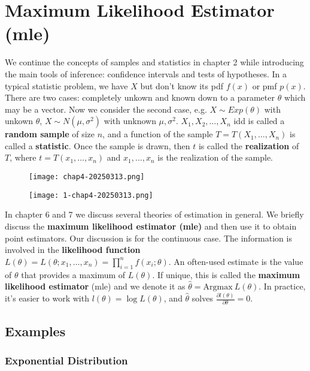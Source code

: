 \section{Maximum Likelihood Estimator (mle)}

We continue the concepts of samples and statistics in chapter 2 while introducing the main tools of inference: confidence intervals and tests of hypotheses.
In a typical statistic problem, we have $X$ but don't know its pdf $f(x)$ or pmf $p(x)$. There are two cases: completely unkown and known down to a parameter $\theta$ which may be a vector. Now we consider the second case, e.g. $X\sim Exp(\theta)$ with unkown $\theta$, $X\sim N(\mu,\sigma^{2})$ with unknown $\mu,\sigma^{2}$.
$X_1,X_2,\dots,X_n$ idd is called a \textbf{random sample} of size $n$, and a function of the sample  $T=T(X_1,\dots,X_n)$  is called a \textbf{statistic}. Once the sample is drawn, then $t$ is called the \textbf{realization} of $T$, where $t=T(x_1,\dots,x_n)$ and $x_1,\dots,x_n$ is the realization of the sample.

\begin{figure}[H]
\centering
\texttt{[image: chap4-20250313.png]}
\label{}
\end{figure}

\begin{figure}[H]
\centering
\texttt{[image: 1-chap4-20250313.png]}
\label{}
\end{figure}

In chapter 6 and 7 we discuss several theories of estimation in general. We briefly discuss the \textbf{maximum likelihood estimator (mle)} and then use it to obtain point estimators. Our discussion is for the continuous case.
The information is involved in the \textbf{likelihood function} $L(\theta)=L(\theta;x_1,\dots,x_n)=\prod_{i=1}^{n}f(x_i;\theta)$. An often-used estimate is the value of $\theta$ that provides a maximum of $L(\theta)$. If unique, this is called the \textbf{maximum likelihood estimator} (mle) and we denote it as $\widehat{\theta}=\mathrm{Argmax}\ L(\theta)$. In practice, it's easier to work with $l(\theta)=\log L(\theta)$, and $\widehat{\theta}$ solves $\frac{ \partial l(\theta) }{ \partial \theta }=0$.

\subsection{Examples}

\subsubsection{Exponential Distribution}


